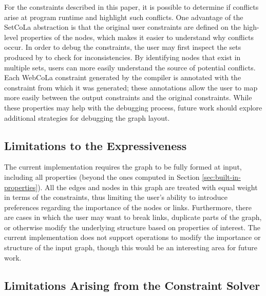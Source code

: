 For the constraints described in this paper, it is possible to determine if
conflicts arise at program runtime and highlight such conflicts. One
advantage of the SetCoLa abstraction is that the original user constraints
are defined on the high-level properties of the nodes, which makes it easier to understand why conflicts occur.
In order to debug the constraints, the user may first inspect the sets produced
by \projectname to check for inconsistencies. By identifying
nodes that exist in multiple sets, users can more easily understand the source
of potential conflicts.  Each WebCoLa constraint generated by the \projectname
compiler is annotated with the \projectname constraint from which it was generated;
these annotations allow the user to map more easily between the output constraints
and the original \projectname constraints. While these properties
may help with the debugging process, future work should explore additional
strategies for debugging the graph layout.

\vspace{-7px}
\subsection{Limitations to the Expressiveness}
The current \projectname implementation requires the graph to be fully formed
at input, including all properties (beyond the ones computed in Section 
\ref{sec:built-in-properties}). All the edges and nodes in this graph are
treated with equal weight in terms of the constraints, thus limiting the user's
ability to introduce preferences regarding the importance of the nodes or links. 
Furthermore, there are cases in which the user may want to break links, duplicate parts of 
the graph, or otherwise modify the underlying structure based on properties of interest.
The current \projectname implementation does not support operations to modify the
importance or structure of the input graph, though this would be an interesting
area for future work.  

\vspace{-7px}
\subsection{Limitations Arising from the Constraint Solver}


